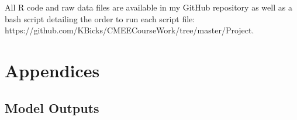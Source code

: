 \documentclass[11pt,a4paper]{article}
\begin{document}
	\\
	\\
	All R code and raw data files are available in my GitHub repository as well as a bash script detailing the order to run each script file: https://github.com/KBicks/CMEECourseWork/tree/master/Project.  
	
	\newpage
	
	
	
	
	
	\newpage
	
	
	\section{Appendices}
	
	\setcounter{table}{0}
	\renewcommand{\thetable}{A\arabic{table}}
	
	\subsection{Model Outputs}
	
\end{document}
